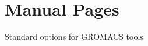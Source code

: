 \chapter{Manual Pages}
\label{app:progman}

{\small
Standard options for GROMACS tools

}
{\small

}

